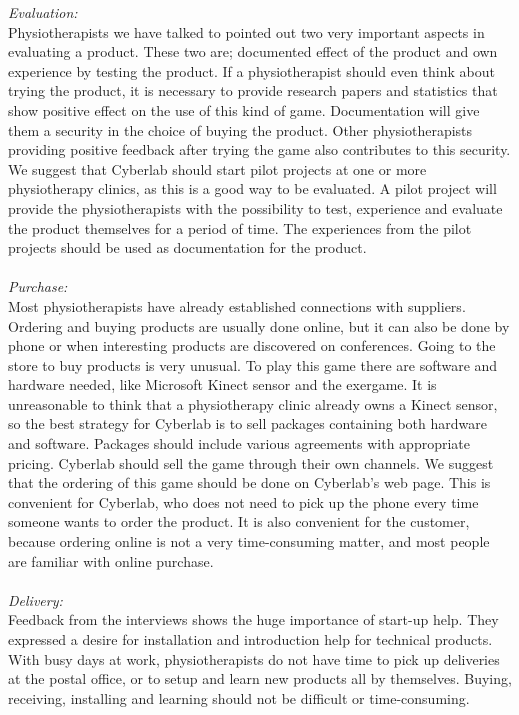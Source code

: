 \emph{Evaluation:}\\
Physiotherapists we have talked to pointed out two very important aspects in evaluating a product. These two are; documented effect of the product and own experience by testing the product. If a physiotherapist should even think about trying the product, it is necessary to provide research papers and statistics that show positive effect on the use of this kind of game. Documentation will give them a security in the choice of buying the product. Other physiotherapists providing positive feedback after trying the game also contributes to this security. We suggest that Cyberlab should start pilot projects at one or more physiotherapy clinics, as this is a good way to be evaluated. A pilot project will provide the physiotherapists with the possibility to test, experience and evaluate the product themselves for a period of time. The experiences from the pilot projects should be used as documentation for the product.\\ \\
\emph{Purchase:} \\
Most physiotherapists have already established connections with suppliers. Ordering and buying products are usually done online, but it can also be done by phone or when interesting products are discovered on conferences. Going to the store to buy products is very unusual. To play this game there are software and hardware needed, like Microsoft Kinect sensor and the exergame. It is unreasonable to think that a physiotherapy clinic already owns a Kinect sensor, so the best strategy for Cyberlab is to sell packages containing both hardware and software. Packages should include various agreements with appropriate pricing. Cyberlab should sell the game through their own channels. We suggest that the ordering of this game should be done on Cyberlab's web page. This is convenient for Cyberlab, who does not need to pick up the phone every time someone wants to order the product. It is also convenient for the customer, because ordering online is not a very time-consuming matter, and most people are familiar with online purchase. \\ \\
\emph{Delivery:}\\
Feedback from the interviews shows the huge importance of start-up help. They expressed a desire for installation and introduction help for technical products. With busy days at work, physiotherapists do not have time to pick up deliveries at the postal office, or to setup and learn new products all by themselves. Buying, receiving, installing and learning should not be difficult or time-consuming. \\ \\
